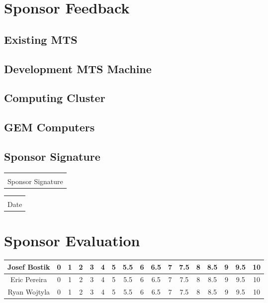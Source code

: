 \documentclass[12pt]{article}
\makeatletter
\newcommand{\titledate}[2][2.5in]{%
	\noindent%
	\begin{tabular}{@{}p{#1}@{}}
		\\ \hline \\[-.75\normalbaselineskip]
		#2
	\end{tabular} \hspace{1in}
	\begin{tabular}{@{}p{#1}@{}}
		\\ \hline \\[-.75\normalbaselineskip]
		Date
	\end{tabular}
}
\makeatother
\begin{document}
\section{Sponsor Feedback}

\subsection{Existing MTS}

\vspace{1in}

\subsection{Development MTS Machine}

\vspace{1in}

\subsection{Computing Cluster}

\vspace{1in}

\subsection{GEM Computers}

\vspace{1in}

\newpage

\subsection{Sponsor Signature}
\vspace{.5in}
 \titledate{Sponsor Signature}
 
\section{Sponsor Evaluation}
\begin{tabular}{|c|c|c|c|c|c|c|c|c|c|c|c|c|c|c|c|c|}
	\hline
	Josef Bostik & 0 & 1 & 2 & 3 & 4 & 5 & 5.5 & 6 & 6.5 & 7 & 7.5 & 8 & 8.5 & 9 & 9.5 & 10\\
	\hline
	Eric Pereira & 0 & 1 & 2 & 3 & 4 & 5 & 5.5 & 6 & 6.5 & 7 & 7.5 & 8 & 8.5 & 9 & 9.5 & 10\\
	\hline
	Ryan Wojtyla & 0 & 1 & 2 & 3 & 4 & 5 & 5.5 & 6 & 6.5 & 7 & 7.5 & 8 & 8.5 & 9 & 9.5 & 10\\
	\hline
\end{tabular}
\end{document}
